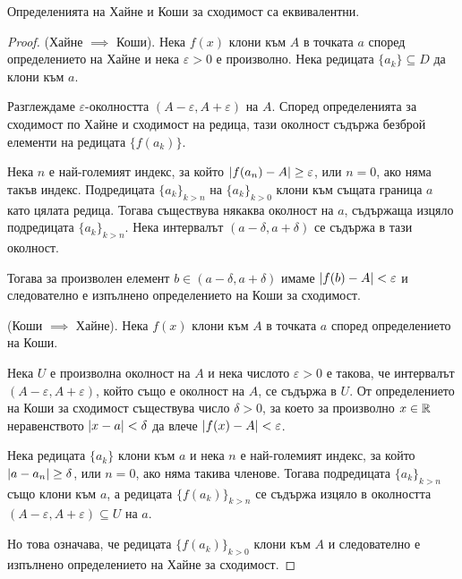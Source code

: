 \documentclass[numbers=endperiod, DIV=15, bibliography=totocnumbered]{scrartcl}
\begin{document}
\begin{theorem}\label{thm:heine-iff-cauchy}
  Определенията на Хайне и Коши за сходимост са еквивалентни.
\end{theorem}
\begin{proof}
  (Хайне $\implies$ Коши). Нека $f(x)$ клони към $A$ в точката $a$ според определението на Хайне и нека $\varepsilon > 0$ е произволно. Нека редицата $\{ a_k \} \subseteq D$ да клони към $a$.

  Разглеждаме $\varepsilon$-околността $(A - \varepsilon, A + \varepsilon)$ на $A$. Според определенията за сходимост по Хайне и сходимост на редица, тази околност съдържа безброй елементи на редицата $\{ f(a_k) \}$.

  Нека $n$ е най-големият индекс, за който $\left\vert f(a_n) - A \right\vert \geq \varepsilon$, или $n = 0$, ако няма такъв индекс. Подредицата ${\{ a_k \}}_{k > n}$ на ${\{ a_k \}}_{k > 0}$ клони към същата граница $a$ като цялата редица. Тогава съществува някаква околност на $a$, съдържаща изцяло подредицата ${\{ a_k \}}_{k > n}$. Нека интервалът $(a - \delta, a + \delta)$ се съдържа в тази околност.

  Тогава за произволен елемент $b \in (a - \delta, a + \delta)$ имаме $\left\vert f(b) - A \right\vert < \varepsilon$ и следователно е изпълнено определението на Коши за сходимост.

  (Коши $\implies$ Хайне). Нека $f(x)$ клони към $A$ в точката $a$ според определението на Коши.

  Нека $U$ е произволна околност на $A$ и нека числото $\varepsilon > 0$ е такова, че интервалът $(A - \varepsilon, A + \varepsilon)$, който също е околност на $A$, се съдържа в $U$. От определението на Коши за сходимост съществува число $\delta > 0$, за което за произволно $x \in \mathbb{R}$ неравенството $\left\vert x - a \right\vert < \delta$ да влече $\left\vert f(x) - A \right\vert < \varepsilon$.

  Нека редицата $\{ a_k \}$ клони към $a$ и нека $n$ е най-големият индекс, за който $\left\vert a - a_n \right\vert \geq \delta$, или $n = 0$, ако няма такива членове. Тогава подредицата ${\{ a_k \}}_{k>n}$ също клони към $a$, а редицата ${\{ f(a_k) \}}_{k>n}$ се съдържа изцяло в околността $(A - \varepsilon, A + \varepsilon) \subseteq U$ на $a$.

  Но това означава, че редицата ${\{ f(a_k) \}}_{k>0}$ клони към $A$ и следователно е изпълнено определението на Хайне за сходимост.
\end{proof}
\end{document}
